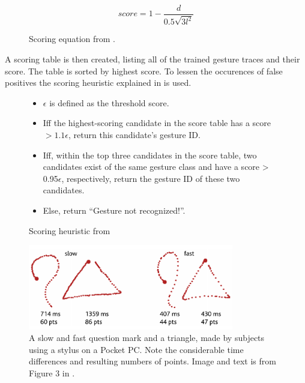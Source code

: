 \begin{figure}
    \begin{equation}
        score = 1-\frac{d}{0.5\sqrt{3l^2}}
    \end{equation}
    \caption{Scoring equation from \protect\cite{threedollar}.}
    \label{eq:gesture-scoring}
\end{figure}

A scoring table is then created, listing all of the trained gesture traces and their score. The table is sorted by highest score.
To lessen the occurences of false positives the scoring heuristic explained in  is used.

\begin{figure}[!htb]
    \begin{itemize}
        \item {$\epsilon$ is defined as the threshold score.}
        \item {Iff the highest-scoring candidate in the score table has
a score $> 1.1\epsilon$, return this candidate’s gesture ID.}
        \item {Iff, within the top three candidates in the score table, two candidates exist of the same gesture class and have a score > 0.95$\epsilon$, respectively, return the gesture ID of these two candidates.}
        \item {Else, return ``Gesture not recognized!''.}
    \end{itemize}
    \caption{Scoring heuristic from \protect\cite{threedollar}}
    \label{three-dollar-heuristic}
\end{figure}

\begin{figure}[!htb]
  \centering
  \includegraphics[width=0.8\textwidth]{images/1-dollar-gesturetrace.png}
  \caption{A slow and fast question mark and a triangle, made by subjects using a stylus on a Pocket PC. Note the considerable time differences and resulting numbers of points. Image and text is from Figure 3 in \protect\cite{wobbrock2007gestures}.}
  \label{fig:onedollar-gesturetrace}
\end{figure}

